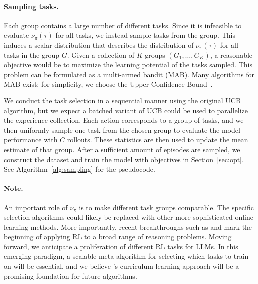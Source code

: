 \paragraph{Sampling tasks.}Each group contains a large number of different tasks. 
Since it is infeasible to evaluate $\nu_\pi(\tau)$ for all tasks, we instead sample tasks from the group. 
This induces a scalar distribution that describes the distribution of $\nu_\pi(\tau)$ for all tasks in the group $G$.
Given a collection of $K$ groups $(G_1, \dots, G_K)$, a reasonable objective would be to maximize the learning potential of the tasks sampled. This problem can be formulated as a multi-armed bandit (MAB). Many algorithms for MAB exist; for simplicity, we choose the Upper Confidence Bound~\citep[UCB]{auer2000using}.

We conduct the task selection in a sequential manner using the original UCB algorithm, but we expect a batched variant of UCB could be used to parallelize the experience collection.
Each action corresponds to a group of tasks, and we then uniformly sample one task from the chosen group to evaluate the model performance with $C$ rollouts. These statistics are then used to update the mean estimate of that group.
After a sufficient amount of episodes are sampled, we construct the dataset and train the model with objectives in Section~\ref{sec:opt}. See Algorithm~\ref{alg:sampling} for the pseudocode.

\paragraph{Note.} An important role of $\nu_\pi$ is to make different task groups comparable. The specific selection algorithms could likely be replaced with other more sophisticated online learning methods. More importantly, recent breakthroughs such as \citet{jaech2024openai} and \citet{deepseekai2025deepseekr1incentivizingreasoningcapability} mark the beginning of applying RL to a broad range of reasoning problems. Moving forward, we anticipate a proliferation of different RL tasks for LLMs. In this emerging paradigm, a scalable meta algorithm for selecting which tasks to train on will be essential, and we believe \ours{}'s curriculum learning approach will be a promising foundation for future algorithms.



